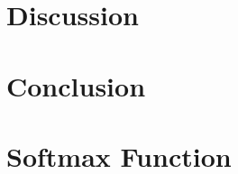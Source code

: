 \documentclass[twocolumn, twoside, 10pt]{article}
\begin{document}
\section{Discussion}


\section{Conclusion}


\clearpage

\onecolumn
\printbibliography[heading=bibnumbered, title=References]
\clearpage

\appendix
\section{Softmax Function}

\clearpage

% 

% 

% 
\end{document}
